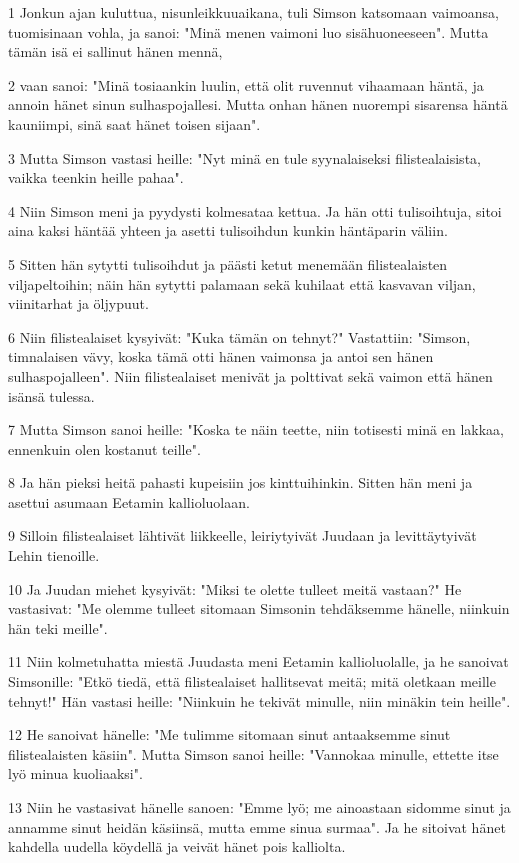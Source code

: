 \par 1 Jonkun ajan kuluttua, nisunleikkuuaikana, tuli Simson katsomaan vaimoansa, tuomisinaan vohla, ja sanoi: "Minä menen vaimoni luo sisähuoneeseen". Mutta tämän isä ei sallinut hänen mennä,
\par 2 vaan sanoi: "Minä tosiaankin luulin, että olit ruvennut vihaamaan häntä, ja annoin hänet sinun sulhaspojallesi. Mutta onhan hänen nuorempi sisarensa häntä kauniimpi, sinä saat hänet toisen sijaan".
\par 3 Mutta Simson vastasi heille: "Nyt minä en tule syynalaiseksi filistealaisista, vaikka teenkin heille pahaa".
\par 4 Niin Simson meni ja pyydysti kolmesataa kettua. Ja hän otti tulisoihtuja, sitoi aina kaksi häntää yhteen ja asetti tulisoihdun kunkin häntäparin väliin.
\par 5 Sitten hän sytytti tulisoihdut ja päästi ketut menemään filistealaisten viljapeltoihin; näin hän sytytti palamaan sekä kuhilaat että kasvavan viljan, viinitarhat ja öljypuut.
\par 6 Niin filistealaiset kysyivät: "Kuka tämän on tehnyt?" Vastattiin: "Simson, timnalaisen vävy, koska tämä otti hänen vaimonsa ja antoi sen hänen sulhaspojalleen". Niin filistealaiset menivät ja polttivat sekä vaimon että hänen isänsä tulessa.
\par 7 Mutta Simson sanoi heille: "Koska te näin teette, niin totisesti minä en lakkaa, ennenkuin olen kostanut teille".
\par 8 Ja hän pieksi heitä pahasti kupeisiin jos kinttuihinkin. Sitten hän meni ja asettui asumaan Eetamin kallioluolaan.
\par 9 Silloin filistealaiset lähtivät liikkeelle, leiriytyivät Juudaan ja levittäytyivät Lehin tienoille.
\par 10 Ja Juudan miehet kysyivät: "Miksi te olette tulleet meitä vastaan?" He vastasivat: "Me olemme tulleet sitomaan Simsonin tehdäksemme hänelle, niinkuin hän teki meille".
\par 11 Niin kolmetuhatta miestä Juudasta meni Eetamin kallioluolalle, ja he sanoivat Simsonille: "Etkö tiedä, että filistealaiset hallitsevat meitä; mitä oletkaan meille tehnyt!" Hän vastasi heille: "Niinkuin he tekivät minulle, niin minäkin tein heille".
\par 12 He sanoivat hänelle: "Me tulimme sitomaan sinut antaaksemme sinut filistealaisten käsiin". Mutta Simson sanoi heille: "Vannokaa minulle, ettette itse lyö minua kuoliaaksi".
\par 13 Niin he vastasivat hänelle sanoen: "Emme lyö; me ainoastaan sidomme sinut ja annamme sinut heidän käsiinsä, mutta emme sinua surmaa". Ja he sitoivat hänet kahdella uudella köydellä ja veivät hänet pois kalliolta.

